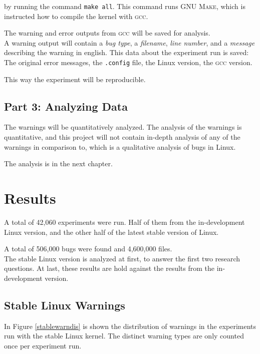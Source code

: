 \documentclass[a4paper,11pt]{report}
\newcommand{\textcode}[1]{\fboxsep=1pt\texttt{\colorbox{gray!20}{#1}}}
\begin{document}
by running the command 
\textcode{make all}. This command runs \textsc{GNU Make}, which is instructed 
how to compile the kernel with \textsc{gcc}.

The warning and error outputs from \textsc{gcc} will be saved for analysis.
\\

A warning output will contain a \emph{bug type}, a \emph{filename}, \emph{line 
number}, and a \emph{message} describing the warning in english. This data about the
experiment run is saved: The original error messages, the \texttt{.config} file, 
the Linux version, the \textsc{gcc} version.

This way the experiment will be reproducible.






            \section{Part 3: Analyzing Data}
The warnings will be quantitatively analyzed.  The analysis of the warnings is 
 quantitative, and this project will not contain in-depth analysis of 
any of the warnings in comparison to\cite{42bugs}, which is a qualitative 
analysis of bugs in Linux.

The analysis is in the next chapter.


\newpage
\chapter{Results}

A total of 42,060 experiments were run. Half of them from the in-development 
Linux version, and the other half of the latest stable version of Linux.

A total of 506,000 bugs were found and 4,600,000 files.
\\

The stable Linux version is analyzed at first, to answer the first two research 
questions. At last, these results are hold against the results from the 
in-development version.


            \section{Stable Linux Warnings}
In Figure \ref{stablewarndis} is shown the distribution of warnings in the 
experiments run with the stable Linux kernel. The distinct warning types are 
only counted once per experiment run.
\end{document}
